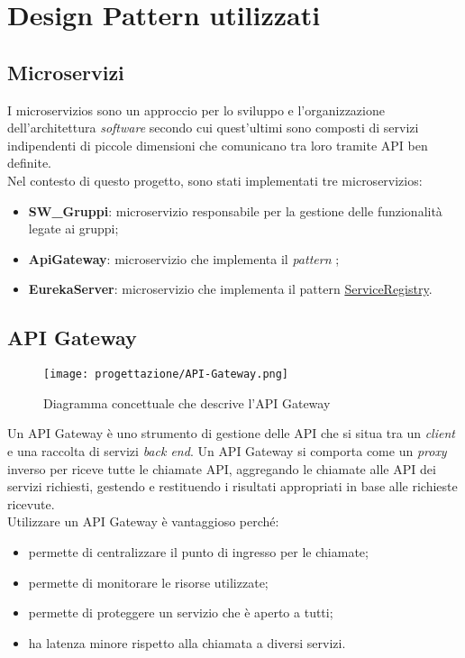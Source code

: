 

\section{Design Pattern utilizzati}
\subsection{Microservizi}
I \glspl{microservizio} sono un approccio per lo sviluppo e l'organizzazione dell'architettura \textit{software} secondo cui quest'ultimi sono composti di servizi indipendenti di piccole dimensioni che comunicano tra loro tramite \gls{API} ben definite.\\
Nel contesto di questo progetto, sono stati implementati tre \glspl{microservizio}: 
\begin{itemize}
    \item \textbf{SW\_Gruppi}: \gls{microservizio} responsabile per la gestione delle funzionalità legate ai gruppi;
    \item \textbf{ApiGateway}: \gls{microservizio} che implementa il \textit{pattern} ;
    \item \textbf{EurekaServer}: \gls{microservizio} che implementa il pattern \hyperref[sub:ServiceRegistry]{ServiceRegistry}. 
\end{itemize}
\subsection{API Gateway}
\label{sub:ApiGateway}
\begin{figure}[H] 
    \centering 
    \texttt{[image: progettazione/API-Gateway.png]} 
    \caption{Diagramma concettuale che descrive l'API Gateway}
\end{figure}
Un \gls{API Gateway} è uno strumento di gestione delle \gls{API} che si situa tra un \textit{client} e una raccolta di servizi \textit{back end}. Un \gls{API Gateway} si comporta come un \textit{proxy} inverso per riceve tutte le chiamate \gls{API}, aggregando le chiamate alle \gls{API} dei servizi richiesti, gestendo e restituendo i risultati appropriati in base alle richieste ricevute.\\
Utilizzare un \gls{API Gateway} è vantaggioso perché: 
\begin{itemize}
    \item permette di centralizzare il punto di ingresso per le chiamate;
    \item permette di monitorare le risorse utilizzate;
    \item permette di proteggere un servizio che è aperto a tutti;
    \item ha latenza minore rispetto alla chiamata a diversi servizi.
\end{itemize}

